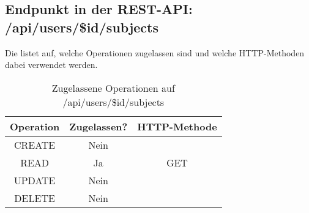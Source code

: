 \subsection{Endpunkt in der REST-API: /api/users/\$id/subjects}
Die  listet auf, welche Operationen zugelassen sind und welche HTTP-Methoden dabei verwendet werden. 

\begin{table}[!htbp]
	\begin{tabular}{|c|c|c|}
		\hline
			\textbf{Operation} & \textbf{Zugelassen?} & \textbf{HTTP-Methode} \\ \hline
			CREATE & Nein &  \\ \hline 
			READ & Ja & GET \\ \hline
			UPDATE & Nein & \\ \hline 
			DELETE & Nein & \\ \hline
	\end{tabular}

		\caption{Zugelassene Operationen auf /api/users/\$id/subjects}
		\label{tab:rest:api:users:id:subjects:meth}
\end{table}

